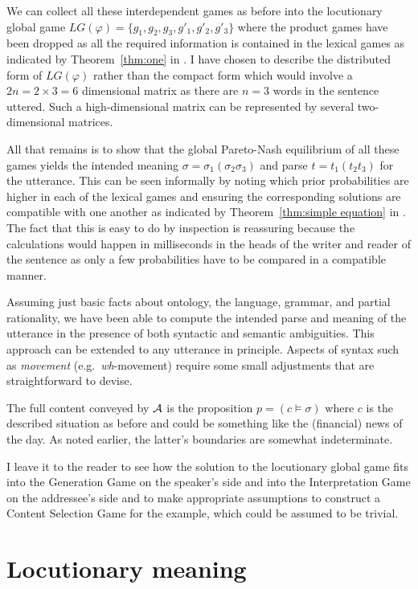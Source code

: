We can collect all these interdependent games as before into the locutionary global game $LG(\varphi) = \{g_1, g_2, g_3, g'_1, g'_2, g'_3\}$ where the product games have been dropped as all the required information is contained in the lexical games as indicated by Theorem~\ref{thm:one} in . I have chosen to describe the distributed form of $LG(\varphi)$ rather than the compact form which would involve a $2n = 2 \times 3 = 6$ dimensional matrix as there are $n = 3$ words in the sentence uttered. Such a high-dimensional matrix can be represented by several two-dimensional matrices.

All that remains is to show that the global Pareto-Nash equilibrium of all these games yields the intended meaning $\sigma = \sigma_1(\sigma_2\sigma_3)$ and parse $t = t_1(t_2t_3)$ for the utterance. This can be seen informally by noting which prior probabilities are higher in each of the lexical games and ensuring the corresponding solutions are compatible with one another as indicated by Theorem~\ref{thm:simple equation} in . The fact that this is easy to do by inspection is reassuring because the calculations would happen in milliseconds in the heads of the writer and reader of the sentence as only a few probabilities have to be compared in a compatible manner.

Assuming just basic facts about ontology, the language, grammar, and partial rationality, we have been able to compute the intended parse and meaning of the utterance in the presence of both syntactic and semantic ambiguities. This approach can be extended to any utterance in principle. Aspects of syntax such as \emph{movement} (e.g.\ \emph{wh}-movement) require some small adjustments that are straightforward to devise.

The full content conveyed by $\cal A$ is the proposition $p = (c \vDash \sigma)$ where $c$ is the described situation as before and could be something like the (financial) news of the day. As noted earlier, the latter's boundaries are somewhat indeterminate.

I leave it to the reader to see how the solution to the locutionary global game fits into the Generation Game on the speaker's side and into the Interpretation Game on the addressee's side and to make appropriate assumptions to construct a Content Selection Game for the example, which could be assumed to be trivial.


\section{Locutionary meaning} \label{locutionary meaning}


